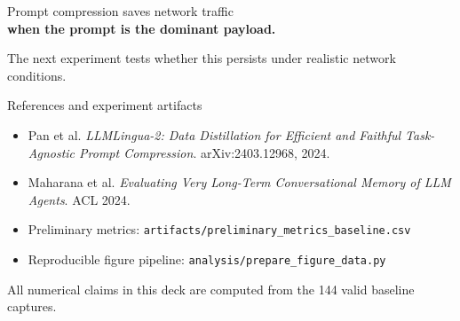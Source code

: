 \documentclass[aspectratio=169,10pt]{beamer}
\begin{document}
\begin{frame}[standout]
  Prompt compression saves network traffic\\
  \textbf{when the prompt is the dominant payload.}

  \vspace{0.5cm}
  {\normalsize The next experiment tests whether this persists under realistic network conditions.}
\end{frame}

\begin{frame}{References and experiment artifacts}
  \small
  \begin{itemize}
    \item Pan et al. \emph{LLMLingua-2: Data Distillation for Efficient and Faithful Task-Agnostic Prompt Compression}. arXiv:2403.12968, 2024.
    \item Maharana et al. \emph{Evaluating Very Long-Term Conversational Memory of LLM Agents}. ACL 2024.
    \item Preliminary metrics: \texttt{artifacts/preliminary\_metrics\_baseline.csv}
    \item Reproducible figure pipeline: \texttt{analysis/prepare\_figure\_data.py}
  \end{itemize}
  \vspace{0.35cm}
  \footnotesize
  All numerical claims in this deck are computed from the 144 valid baseline captures.
\end{frame}
\end{document}
